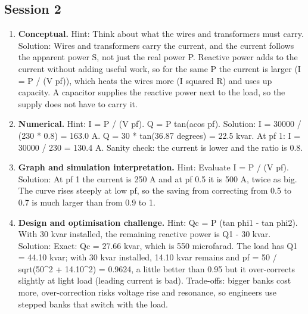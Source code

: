 \documentclass[11pt,a4paper]{article}
\begin{document}
\subsection*{Session 2}
\begin{enumerate}[nosep]
\item \textbf{Conceptual.} Hint: Think about what the wires and transformers must carry. Solution: Wires and transformers carry the current, and the current follows the apparent power S, not just the real power P. Reactive power adds to the current without adding useful work, so for the same P the current is larger (I = P / (V pf)), which heats the wires more (I squared R) and uses up capacity. A capacitor supplies the reactive power next to the load, so the supply does not have to carry it.
\item \textbf{Numerical.} Hint: I = P / (V pf). Q = P tan(acos pf). Solution: I = 30000 / (230 * 0.8) = 163.0 A. Q = 30 * tan(36.87 degrees) = 22.5 kvar. At pf 1: I = 30000 / 230 = 130.4 A. Sanity check: the current is lower and the ratio is 0.8.
\item \textbf{Graph and simulation interpretation.} Hint: Evaluate I = P / (V pf). Solution: At pf 1 the current is 250 A and at pf 0.5 it is 500 A, twice as big. The curve rises steeply at low pf, so the saving from correcting from 0.5 to 0.7 is much larger than from 0.9 to 1.
\item \textbf{Design and optimisation challenge.} Hint: Qc = P (tan phi1 - tan phi2). With 30 kvar installed, the remaining reactive power is Q1 - 30 kvar. Solution: Exact: Qc = 27.66 kvar, which is 550 microfarad. The load has Q1 = 44.10 kvar; with 30 kvar installed, 14.10 kvar remains and pf = 50 / sqrt(50\textasciicircum{}2 + 14.10\textasciicircum{}2) = 0.9624, a little better than 0.95 but it over-corrects slightly at light load (leading current is bad). Trade-offs: bigger banks cost more, over-correction risks voltage rise and resonance, so engineers use stepped banks that switch with the load.
\end{enumerate}
\end{document}
